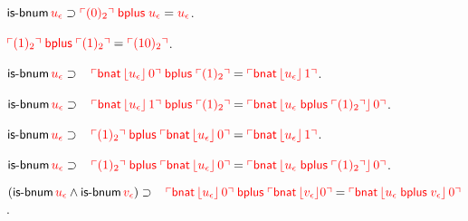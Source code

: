 \documentclass[fleqn,11pt]{article}
\begin{document}
    \item $\mbox{\sf is-bnum} \, \textcolor{red}{u_\epsilon} \supset
      \textcolor{red}{\ulcorner(0)_2\urcorner \; \mbox{\sf bplus} \; u_\epsilon} =
      \textcolor{red}{u_\epsilon}$.

    \item $\textcolor{red}{\ulcorner(1)_2\urcorner \; \mbox{\sf bplus} \;
      \ulcorner(1)_2\urcorner} = \textcolor{red}{\ulcorner(10)_2\urcorner}$.

    \item $\mbox{\sf is-bnum} \, \textcolor{red}{u_\epsilon} \supset {}\\
        \hspace*{2ex} \textcolor{red}{\ulcorner\mbox{\sf bnat} \,
            \lfloor u_\epsilon\rfloor \, 0\urcorner \; \mbox{\sf bplus} \;
          \ulcorner(1)_2\urcorner} = \textcolor{red}{\ulcorner\mbox{\sf bnat} \,
            \lfloor u_\epsilon\rfloor \, 1\urcorner}$.

    \item $\mbox{\sf is-bnum} \, \textcolor{red}{u_\epsilon} \supset {}\\
        \hspace*{2ex} \textcolor{red}{\ulcorner\mbox{\sf bnat} \,
            \lfloor u_\epsilon\rfloor \, 1\urcorner \; \mbox{\sf bplus} \;
          \ulcorner(1)_2\urcorner} = \textcolor{red}{\ulcorner\mbox{\sf bnat} \,
            \lfloor u_\epsilon \; \mbox{\sf bplus} \;
              \ulcorner(1)_2\urcorner\rfloor \, 0\urcorner}$.

    \item $\mbox{\sf is-bnum} \, \textcolor{red}{u_\epsilon} \supset {}\\
        \hspace*{2ex} \textcolor{red}{\ulcorner(1)_2\urcorner \; \mbox{\sf bplus} \;
          \ulcorner\mbox{\sf bnat} \, \lfloor u_\epsilon\rfloor \, 0\urcorner} =
        \textcolor{red}{\ulcorner\mbox{\sf bnat} \, \lfloor u_\epsilon\rfloor \,
            1\urcorner}$.

    \item $\mbox{\sf is-bnum} \, \textcolor{red}{u_\epsilon} \supset {}\\
        \hspace*{2ex} \textcolor{red}{\ulcorner(1)_2\urcorner \; \mbox{\sf bplus} \;
          \ulcorner\mbox{\sf bnat} \, \lfloor u_\epsilon\rfloor \, 0\urcorner} =
        \textcolor{red}{\ulcorner\mbox{\sf bnat} \, \lfloor u_\epsilon \;
              \mbox{\sf bplus} \; \ulcorner(1)_2\urcorner\rfloor \, 0\urcorner}$.

    \item $(\mbox{\sf is-bnum} \, \textcolor{red}{u_\epsilon} \wedge \mbox{\sf is-bnum}
      \, \textcolor{red}{v_\epsilon}) \supset {}\\
        \hspace*{2ex} \textcolor{red}{\ulcorner\mbox{\sf bnat} \,
            \lfloor u_\epsilon\rfloor \, 0\urcorner \; \mbox{\sf bplus} \;
          \ulcorner\mbox{\sf bnat} \, \lfloor v_\epsilon\rfloor 0\urcorner} =
        \textcolor{red}{\ulcorner\mbox{\sf bnat} \, \lfloor u_\epsilon \;
              \mbox{\sf bplus} \; v_\epsilon\rfloor \, 0\urcorner}$.
\end{document}
